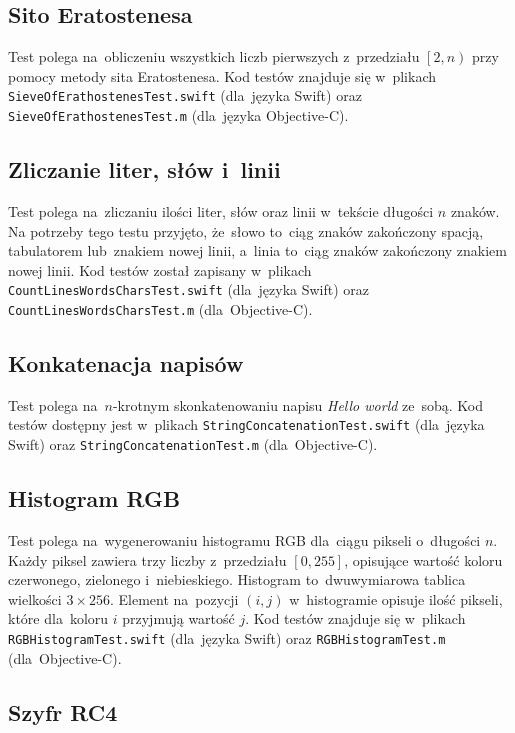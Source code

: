 \documentclass[mgr, shortabstract]{iithesis}
\begin{document}
\subsection{Sito Eratostenesa}

Test polega na~obliczeniu wszystkich liczb pierwszych z~przedziału $\left[2, n\right)$ przy pomocy metody sita Eratostenesa. Kod testów znajduje się w~plikach \texttt{SieveOfErathostenesTest.swift} (dla~języka Swift) oraz \texttt{SieveOfErathostenesTest.m} (dla~języka Objective-C).

\subsection{Zliczanie liter, słów i~linii}

Test polega na~zliczaniu ilości liter, słów oraz linii w~tekście długości $n$ znaków. Na potrzeby tego testu przyjęto, że~słowo to~ciąg znaków zakończony spacją, tabulatorem lub~znakiem nowej linii, a~linia to~ciąg znaków zakończony znakiem nowej linii. Kod testów został zapisany w~plikach \texttt{CountLinesWordsCharsTest.swift} (dla~języka Swift) oraz \texttt{CountLinesWordsCharsTest.m} (dla~Objective-C).

\subsection{Konkatenacja napisów}

Test polega na~$n$-krotnym skonkatenowaniu napisu \textit{Hello world} ze~sobą. Kod testów dostępny jest w~plikach \texttt{StringConcatenationTest.swift} (dla~języka Swift) oraz \texttt{StringConcatenationTest.m} (dla~Objective-C).

\subsection{Histogram RGB}

Test polega na~wygenerowaniu histogramu RGB dla~ciągu pikseli o~długości $n$. Każdy piksel zawiera trzy liczby z~przedziału $\left[0, 255\right]$, opisujące wartość koloru czerwonego, zielonego i~niebieskiego. Histogram to~dwuwymiarowa tablica wielkości $3 \times 256$. Element na~pozycji $(i, j)$ w~histogramie opisuje ilość pikseli, które dla~koloru $i$ przyjmują wartość $j$. Kod testów znajduje się w~plikach \texttt{RGBHistogramTest.swift} (dla~języka Swift) oraz \texttt{RGBHistogramTest.m} (dla~Objective-C).

\subsection{Szyfr RC4}
\end{document}
